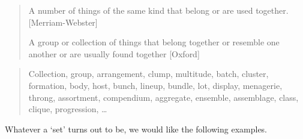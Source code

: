 
\vspace{1em}  %

\begin{definition}[Set]
\begin{quote}
A number of things of the same kind that belong or are used together. [Merriam-Webster]

A group or collection of things that belong together or resemble one another or are usually found together [Oxford]
\end{quote}
\end{definition}

\vspace{1em}  %

\begin{definition}
\begin{quote}
Collection, group, arrangement, clump, multitude, batch, cluster, formation, body, host, bunch, lineup, bundle, lot, display, menagerie, throng, assortment, compendium, aggregate, ensemble, assemblage, class, clique, progression, \dots
\end{quote}
\end{definition}


\vspace{1em}  %

Whatever a `set' turns out to be, we would like the following examples.

